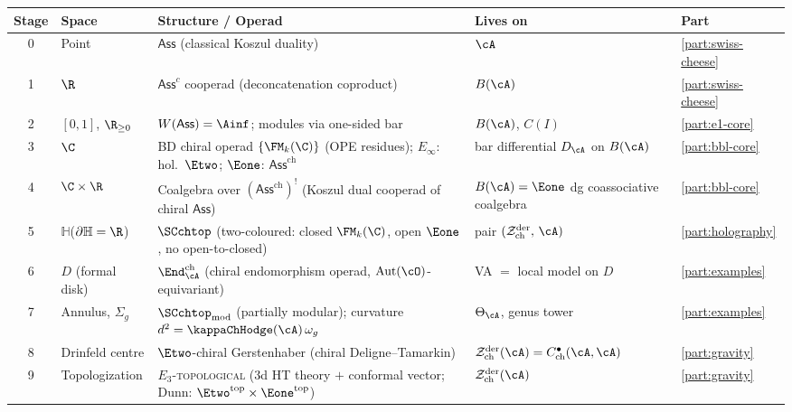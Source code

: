 \begin{center}
\renewcommand{\arraystretch}{1.35}
\small
\begin{tabular}{c p{3.6cm} p{4.8cm} p{3.0cm} l}
\textbf{Stage} & \textbf{Space} & \textbf{Structure / Operad} & \textbf{Lives on} & \textbf{Part} \\
\hline
0 &
 Point &
 $\mathsf{Ass}$ (classical Koszul duality) &
 $\cA$ &
 \ref{part:swiss-cheese} \\[2pt]
1 &
 $\R$ &
 $\mathsf{Ass}^c$ cooperad (deconcatenation coproduct) &
 $B(\cA)$ &
 \ref{part:swiss-cheese} \\[2pt]
2 &
 $[0,1]$, $\R_{\ge 0}$ &
 $W(\mathsf{Ass}) = \Ainf$; modules via one-sided bar &
 $B(\cA)$, $C(I)$ &
 \ref{part:e1-core} \\[2pt]
3 &
 $\C$ &
 BD chiral operad $\{\FM_k(\C)\}$ (OPE residues);
 $E_\infty$: hol.\ $\Etwo$; $\Eone$: $\mathsf{Ass}^{\mathrm{ch}}$ &
 bar differential $D_\cA$ on $B(\cA)$ &
 \ref{part:bbl-core} \\[2pt]
4 &
 $\C \times \R$ &
 Coalgebra over $(\mathsf{Ass}^{\mathrm{ch}})^!$
 (Koszul dual cooperad of chiral $\mathsf{Ass}$) &
 $B(\cA) = \Eone$ dg coassociative coalgebra &
 \ref{part:bbl-core} \\[2pt]
5 &
 $\mathbb{H}$\enspace ($\partial\mathbb{H} = \R$) &
 $\SCchtop$ (two-coloured: closed $\FM_k(\C)$, open $\Eone$,
 no open-to-closed) &
 pair $(\cZ^{\mathrm{der}}_{\mathrm{ch}},\, \cA)$ &
 \ref{part:holography} \\[2pt]
6 &
 $D$ (formal disk) &
 $\End^{\mathrm{ch}}_\cA$ (chiral endomorphism operad,
 $\operatorname{Aut}(\cO)$-equivariant) &
 VA $=$ local model on $D$ &
 \ref{part:examples} \\[2pt]
7 &
 Annulus, $\Sigma_g$ &
 $\SCchtop_{\mathrm{mod}}$ (partially modular);
 curvature $d^2 = \kappaChHodge(\cA)\,\omega_g$ &
 $\Theta_\cA$, genus tower &
 \ref{part:examples} \\[2pt]
8 &
 Drinfeld centre &
 $\Etwo$-chiral Gerstenhaber (chiral Deligne--Tamarkin) &
 $\cZ^{\mathrm{der}}_{\mathrm{ch}}(\cA) = C^\bullet_{\mathrm{ch}}(\cA,\cA)$ &
 \ref{part:gravity} \\[2pt]
9 &
 Topologization &
 $E_3$-\textsc{topological} (3d HT theory $+$ conformal vector;
 Dunn: $\Etwo^{\mathrm{top}} \times \Eone^{\mathrm{top}}$) &
 $\cZ^{\mathrm{der}}_{\mathrm{ch}}(\cA)$ &
 \ref{part:gravity}
\end{tabular}
\end{center}

